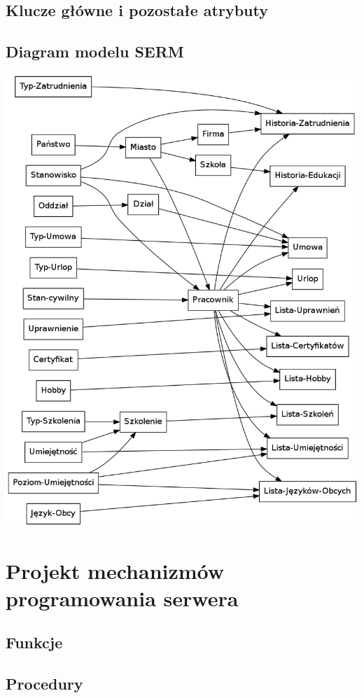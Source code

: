 \documentclass[a4paper]{article}
\begin{document}


\subsection{Klucze główne i pozostałe atrybuty}


\subsection{Diagram modelu SERM}
\includegraphics[width=\textwidth]{tex/srem.png}

\section{Projekt mechanizmów programowania serwera}
\subsection{Funkcje}

\subsection{Procedury}
\end{document}
